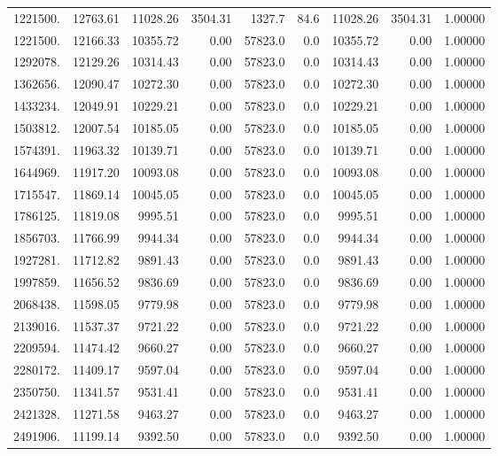 {\begin{tabular}{rrrrrrrrr}
1221500.& 12763.61& 11028.26 & 3504.31  & 1327.7    & 84.6& 11028.26 & 3504.31 & 1.00000 \\
1221500.& 12166.33& 10355.72    & 0.00 & 57823.0     & 0.0& 10355.72    & 0.00 & 1.00000 \\
1292078.& 12129.26& 10314.43    & 0.00 & 57823.0     & 0.0& 10314.43    & 0.00 & 1.00000 \\
1362656.& 12090.47& 10272.30    & 0.00 & 57823.0     & 0.0& 10272.30    & 0.00 & 1.00000 \\
1433234.& 12049.91& 10229.21    & 0.00 & 57823.0     & 0.0& 10229.21    & 0.00 & 1.00000 \\
1503812.& 12007.54& 10185.05    & 0.00 & 57823.0     & 0.0& 10185.05    & 0.00 & 1.00000 \\
1574391.& 11963.32& 10139.71    & 0.00 & 57823.0     & 0.0& 10139.71    & 0.00 & 1.00000 \\
1644969.& 11917.20& 10093.08    & 0.00 & 57823.0     & 0.0& 10093.08    & 0.00 & 1.00000 \\
1715547.& 11869.14& 10045.05    & 0.00 & 57823.0     & 0.0& 10045.05    & 0.00 & 1.00000 \\
1786125.& 11819.08 & 9995.51    & 0.00 & 57823.0     & 0.0 & 9995.51    & 0.00 & 1.00000 \\
1856703.& 11766.99 & 9944.34    & 0.00 & 57823.0     & 0.0 & 9944.34    & 0.00 & 1.00000 \\
1927281.& 11712.82 & 9891.43    & 0.00 & 57823.0     & 0.0 & 9891.43    & 0.00 & 1.00000 \\
1997859.& 11656.52 & 9836.69    & 0.00 & 57823.0     & 0.0 & 9836.69    & 0.00 & 1.00000 \\
2068438.& 11598.05 & 9779.98    & 0.00 & 57823.0     & 0.0 & 9779.98    & 0.00 & 1.00000 \\
2139016.& 11537.37 & 9721.22    & 0.00 & 57823.0     & 0.0 & 9721.22    & 0.00 & 1.00000 \\
2209594.& 11474.42 & 9660.27    & 0.00 & 57823.0     & 0.0 & 9660.27    & 0.00 & 1.00000 \\
2280172.& 11409.17 & 9597.04    & 0.00 & 57823.0     & 0.0 & 9597.04    & 0.00 & 1.00000 \\
2350750.& 11341.57 & 9531.41    & 0.00 & 57823.0     & 0.0 & 9531.41    & 0.00 & 1.00000 \\
2421328.& 11271.58 & 9463.27    & 0.00 & 57823.0     & 0.0 & 9463.27    & 0.00 & 1.00000 \\
2491906.& 11199.14 & 9392.50    & 0.00 & 57823.0     & 0.0 & 9392.50    & 0.00 & 1.00000 \\

\end{tabular}}
